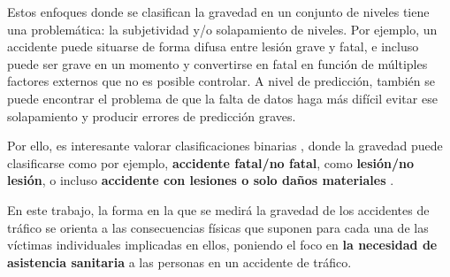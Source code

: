 \documentclass{uathesis-es}
\begin{document}
Estos enfoques donde se clasifican la gravedad en un conjunto de niveles tiene una problemática: la subjetividad y/o solapamiento de niveles. Por ejemplo, un accidente puede situarse de forma difusa entre lesión grave y fatal, e incluso puede ser grave en un momento y convertirse en fatal en función de múltiples factores externos que no es posible controlar. A nivel de predicción, también se puede encontrar el problema de que la falta de datos haga más difícil evitar ese solapamiento y producir errores de predicción graves.

Por ello, es interesante valorar clasificaciones binarias \cite{prati2017using, hosseinzadeh2021investigating}, donde la gravedad puede clasificarse como por ejemplo, \textbf{accidente fatal/no fatal}, como \textbf{lesión/no lesión}, o incluso \textbf{accidente con lesiones o solo daños materiales }\cite{zhang2022hybrid, ma2021analytic}.



En este trabajo, la forma en la que se medirá la gravedad de los accidentes de tráfico se orienta a las consecuencias físicas que suponen para cada una de las víctimas individuales implicadas en ellos, poniendo el foco en \textbf{la necesidad de asistencia sanitaria} a las personas en un accidente de tráfico.



\end{document}
